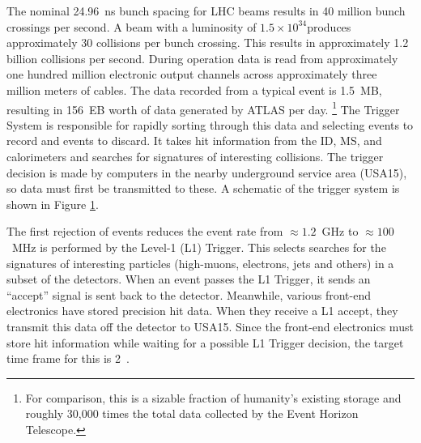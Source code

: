 \begin{figure}[h!]
\captionsetup[subfigure]{position=b}
\centering
{}
\caption{}
\label{fig:atlasTrigger}
\end{figure}

The nominal 24.96~ns bunch spacing for LHC beams results in 40 million bunch crossings per second.
A beam with a luminosity of $1.5\times10^{34}$\cms produces approximately 30 collisions per bunch crossing.
This results in approximately 1.2 billion collisions per second.
During operation data is read from approximately one hundred million electronic output channels across approximately three million meters of cables. \cite{atlasFacts}
The data recorded from a typical event is 1.5~MB, resulting in 156~EB worth of data generated by ATLAS per day.
\footnote{For comparison, this is a sizable fraction of humanity's existing storage and roughly 30,000 times the total data collected by the Event Horizon Telescope.}
The Trigger System is responsible for rapidly sorting through this data and selecting events to record and events to discard.
It takes hit information from the ID, MS, and calorimeters and searches for signatures of interesting collisions.
The trigger decision is made by computers in the nearby underground service area (USA15), so data must first be transmitted to these.
A schematic of the trigger system is shown in Figure \ref{fig:atlasTrigger}.

The first rejection of events reduces the event rate from $\approx1.2$~GHz to $\approx100$~MHz is performed by the Level-1 (L1) Trigger.
This selects searches for the signatures of interesting particles (high-\pt muons, electrons, jets and others) in a subset of the detectors.
When an event passes the L1 Trigger, it sends an ``accept'' signal is sent back to the detector.
Meanwhile, various front-end electronics have stored precision hit data.
When they receive a L1 accept, they transmit this data off the detector to USA15.
Since the front-end electronics must store hit information while waiting for a possible L1 Trigger decision, the target time frame for this is 2~\us. 
\cite{triggerTdr}

